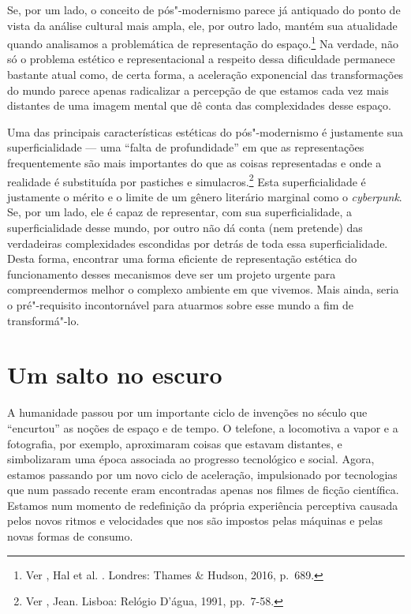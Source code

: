 Se, por um lado, o conceito de pós"-modernismo parece já antiquado do
ponto de vista da análise cultural mais ampla, ele, por outro lado,
mantém sua atualidade quando analisamos a problemática de representação
do espaço.\footnote{Ver , Hal et al. {}. Londres: Thames \& Hudson,
  2016, p.~689.} Na verdade, não só o problema estético e
representacional a respeito dessa dificuldade permanece bastante atual
como, de certa forma, a aceleração exponencial das transformações do
mundo parece apenas radicalizar a percepção de que estamos cada vez mais
distantes de uma imagem mental que dê conta das complexidades desse
espaço.

Uma das principais características estéticas do pós"-modernismo é
justamente sua superficialidade --- uma ``falta de profundidade'' em que as
representações frequentemente são mais importantes do que as coisas
representadas e onde a realidade é substituída por pastiches e
simulacros.\footnote{Ver , Jean. {} Lisboa: Relógio D'água, 1991, pp.~7-58.} Esta
superficialidade é justamente o mérito e o limite de um gênero literário
marginal como o \emph{cyberpunk}. Se, por um lado, ele é capaz de
representar, com sua superficialidade, a superficialidade desse mundo,
por outro não dá conta (nem pretende) das verdadeiras complexidades
escondidas por detrás de toda essa superficialidade. Desta forma,
encontrar uma forma eficiente de representação estética do funcionamento
desses mecanismos deve ser um projeto urgente para compreendermos melhor
o complexo ambiente em que vivemos. Mais ainda, seria o pré"-requisito
incontornável para atuarmos sobre esse mundo a fim de transformá"-lo.

\chapter{Um salto no escuro}

A humanidade passou por um importante ciclo de invenções no século 
que ``encurtou'' as noções de espaço e de tempo. O telefone, a
locomotiva a vapor e a fotografia, por exemplo, aproximaram coisas que
estavam distantes, e simbolizaram uma época associada ao progresso
tecnológico e social. Agora, estamos passando por um novo ciclo de
aceleração, impulsionado por tecnologias que num passado recente eram
encontradas apenas nos filmes de ficção científica. Estamos num momento
de redefinição da própria experiência perceptiva causada pelos novos
ritmos e velocidades que nos são impostos pelas máquinas e pelas novas
formas de consumo.

